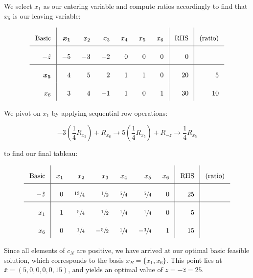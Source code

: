 \begin{solution}
  We select $x_1$ as our entering variable and compute ratios accordingly to find that $x_5$ is our leaving variable:


  \[\arraycolsep=8pt\def\arraystretch{2.2}
  \begin{array}{r|rrrrrr|r|r}
    \text{Basic} &  \bm{x_1}  &  x_2  &  x_3  &  x_4  & x_5 & x_6  & \text{RHS} & \text{(ratio)}  \\ \hline
    -\hat{z}     &  -5        &  -3   &  -2   &   0   &  0  &  0   &   0        &                 \\ \hline
    \bm{x_5}     &   4        &   5   &   2   &   1   &  1  &  0   &  20        & 5               \\
    x_6          &   3        &   4   &  -1   &   1   &  0  &  1   &  30        & 10              
  \end{array}
  \]

  \pagebreak
  We pivot on $x_1$ by applying sequential row operations:

  $$
  -3 \left(\frac{1}{4} R_{x_5}\right) + R_{x_6} \longrightarrow 
  5 \left(\frac{1}{4} R_{x_5}\right) + R_{-z} \longrightarrow 
  \frac{1}{4} R_{x_5}
  $$

  to find our final tableau:

  \[\arraycolsep=8pt\def\arraystretch{2.2}
  \begin{array}{r|rrrrrr|r|r}
    \text{Basic} &  x_1  &  x_2            &  x_3           &  x_4           & x_5            & x_6  & \text{RHS} & \text{(ratio)}  \\ \hline
    -\hat{z}     &   0   &  \sfrac{13}{4}  &  \sfrac{1}{2}  &  \sfrac{5}{4}  &  \sfrac{5}{4}  &  0   &  25        &                 \\ \hline
    x_1          &   1   &  \sfrac{5}{4}   &  \sfrac{1}{2}  &  \sfrac{1}{4}  &  \sfrac{1}{4}  &  0   &   5        &                 \\
    x_6          &   0   &  \sfrac{1}{4}   & -\sfrac{5}{2}  &  \sfrac{1}{4}  & -\sfrac{3}{4}  &  1   &  15        &              
  \end{array}
  \]

  Since all elements of $c_N$ are positive, we have arrived at our optimal basic feasible solution, which corresponds to
  the basis $x_B = \{x_1, x_6\}$. This point lies at \linebreak
  $\bar{x} = \left(5, 0, 0, 0, 0, 15\right)$, and yields an optimal value of $z = -\hat{z} = 25$.
  \ \\
\end{solution}